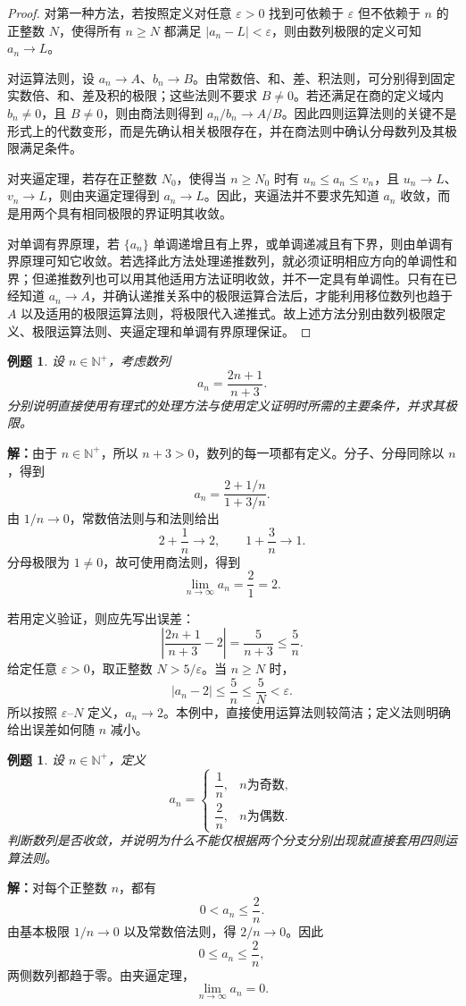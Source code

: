 \documentclass[UTF8,fontset=fandol,11pt]{ctexart}
\newtheorem{example}[definition]{例题}
\begin{document}
\begin{proof}
对第一种方法，若按照定义对任意 $\varepsilon>0$ 找到可依赖于 $\varepsilon$ 但不依赖于 $n$ 的正整数 $N$，使得所有 $n\geq N$ 都满足 $|a_n-L|<\varepsilon$，则由数列极限的定义可知 $a_n\to L$。

对运算法则，设 $a_n\to A$、$b_n\to B$。由常数倍、和、差、积法则，可分别得到固定实数倍、和、差及积的极限；这些法则不要求 $B\neq0$。若还满足在商的定义域内 $b_n\neq0$，且 $B\neq0$，则由商法则得到 $a_n/b_n\to A/B$。因此四则运算法则的关键不是形式上的代数变形，而是先确认相关极限存在，并在商法则中确认分母数列及其极限满足条件。

对夹逼定理，若存在正整数 $N_0$，使得当 $n\geq N_0$ 时有 $u_n\leq a_n\leq v_n$，且 $u_n\to L$、$v_n\to L$，则由夹逼定理得到 $a_n\to L$。因此，夹逼法并不要求先知道 $a_n$ 收敛，而是用两个具有相同极限的界证明其收敛。

对单调有界原理，若 $\{a_n\}$ 单调递增且有上界，或单调递减且有下界，则由单调有界原理可知它收敛。若选择此方法处理递推数列，就必须证明相应方向的单调性和界；但递推数列也可以用其他适用方法证明收敛，并不一定具有单调性。只有在已经知道 $a_n\to A$，并确认递推关系中的极限运算合法后，才能利用移位数列也趋于 $A$ 以及适用的极限运算法则，将极限代入递推式。故上述方法分别由数列极限定义、极限运算法则、夹逼定理和单调有界原理保证。
\end{proof}
\begin{example}
设 $n\in\mathbb{N}^{+}$，考虑数列
\[
a_n=\frac{2n+1}{n+3}.
\]
分别说明直接使用有理式的处理方法与使用定义证明时所需的主要条件，并求其极限。
\end{example}
\par\noindent\textbf{解：}由于 $n\in\mathbb{N}^{+}$，所以 $n+3>0$，数列的每一项都有定义。分子、分母同除以 $n$，得到
\[
a_n=\frac{2+1/n}{1+3/n}.
\]
由 $1/n\to0$，常数倍法则与和法则给出
\[
2+\frac1n\to2,\qquad 1+\frac3n\to1.
\]
分母极限为 $1\neq0$，故可使用商法则，得到
\[
\lim_{n\to\infty}a_n=\frac21=2.
\]

若用定义验证，则应先写出误差：
\[
\left|\frac{2n+1}{n+3}-2\right|=\frac5{n+3}\leq\frac5n.
\]
给定任意 $\varepsilon>0$，取正整数 $N>5/\varepsilon$。当 $n\geq N$ 时，
\[
\left|a_n-2\right|\leq\frac5n\leq\frac5N<\varepsilon.
\]
所以按照 $\varepsilon$--$N$ 定义，$a_n\to2$。本例中，直接使用运算法则较简洁；定义法则明确给出误差如何随 $n$ 减小。\par
\begin{example}
设 $n\in\mathbb{N}^{+}$，定义
\[
a_n=
\begin{cases}
\dfrac1n,&n\text{为奇数},\\[4pt]
\dfrac2n,&n\text{为偶数}.
\end{cases}
\]
判断数列是否收敛，并说明为什么不能仅根据两个分支分别出现就直接套用四则运算法则。
\end{example}
\par\noindent\textbf{解：}对每个正整数 $n$，都有
\[
0<a_n\leq\frac2n.
\]
由基本极限 $1/n\to0$ 以及常数倍法则，得 $2/n\to0$。因此
\[
0\leq a_n\leq\frac2n,
\]
两侧数列都趋于零。由夹逼定理，
\[
\lim_{n\to\infty}a_n=0.
\]
\end{document}

